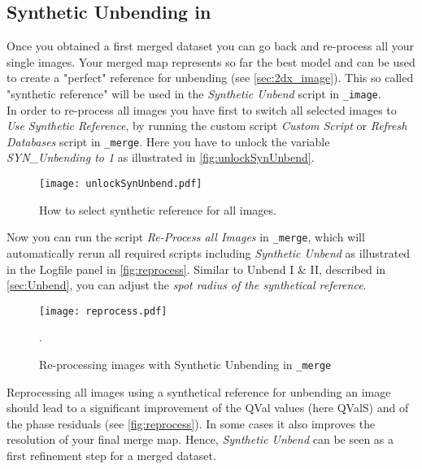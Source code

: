 \subsection{Synthetic Unbending in {\twodx}}
\label{sec:syn_unbending}

Once you obtained a first merged dataset you can go back and re-process all your single images. Your merged map represents so far the best model and can be used to create a "perfect" reference for unbending (see \autoref{sec:2dx_image}). This so called "synthetic reference"  will be used in the \textit{Synthetic Unbend} script in {\twodx}\texttt{\_image}.  \\ 
In order to re-process all images you have first to switch all selected images to \textit{Use Synthetic Reference}, by running the custom script \textit{Custom Script} or \textit{Refresh Databases}  script in {\twodx}\texttt{\_merge}. Here you have to unlock the variable \textit{SYN\_Unbending to 1} as illustrated in \autoref{fig:unlockSynUnbend}.  

\begin{figure}[H]
		\centering
		\texttt{[image: unlockSynUnbend.pdf]}
		\caption{How to select synthetic reference for all images.}
		\label{fig:unlockSynUnbend}
	\end{figure}
	
Now you can run the script \textit{Re-Process all Images} in {\twodx}\texttt{\_merge}, which will automatically rerun all required scripts including \textit{Synthetic Unbend} as illustrated in the Logfile panel in \autoref{fig:reprocess}. Similar to Unbend I \& II, described in \autoref{sec:Unbend}, you can adjust the \textit{spot radius of the synthetical reference}.

\begin{figure}[H]
		\centering
		\texttt{[image: reprocess.pdf]}
		\caption{Re-processing images with Synthetic Unbending in {\twodx}\texttt{\_merge}}.
		\label{fig:reprocess}
	\end{figure}
	

Reprocessing all images using a synthetical reference for unbending an image should lead to a significant improvement of the QVal values (here QValS) and of the phase residuals (see \autoref{fig:reprocess}). In some cases it also improves the resolution of your final merge map. Hence, \textit{Synthetic Unbend} can be seen as a first refinement step for a merged dataset. 



